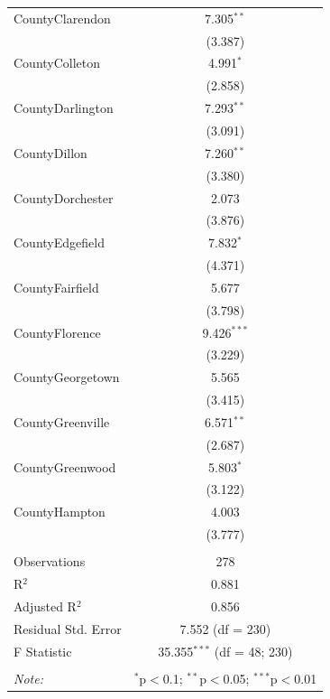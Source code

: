 \documentclass[11pt]{article}
\begin{document}
\begin{table}[H]
\begin{tabular}{@{\extracolsep{5pt}}lc}
     CountyClarendon & 7.305$^{**}$ \\
     & (3.387) \\
     CountyColleton & 4.991$^{*}$ \\
     & (2.858) \\
     CountyDarlington & 7.293$^{**}$ \\
     & (3.091) \\
     CountyDillon & 7.260$^{**}$ \\
     & (3.380) \\
     CountyDorchester & 2.073 \\
     & (3.876) \\
     CountyEdgefield & 7.832$^{*}$ \\
     & (4.371) \\
     CountyFairfield & 5.677 \\
     & (3.798) \\
     CountyFlorence & 9.426$^{***}$ \\
     & (3.229) \\
     CountyGeorgetown & 5.565 \\
     & (3.415) \\
     CountyGreenville & 6.571$^{**}$ \\
     & (2.687) \\
     CountyGreenwood & 5.803$^{*}$ \\
     & (3.122) \\
     CountyHampton & 4.003 \\
     & (3.777) \\

     \hline \\[-1.8ex]
     Observations & 278 \\
     R$^{2}$ & 0.881 \\
     Adjusted R$^{2}$ & 0.856 \\
     Residual Std. Error & 7.552 (df = 230) \\
     F Statistic & 35.355$^{***}$ (df = 48; 230) \\
    \hline
    \hline \\[-1.8ex]
    \textit{Note:}  & \multicolumn{1}{r}{$^{*}$p$<$0.1; $^{**}$p$<$0.05; $^{***}$p$<$0.01} \\
    \end{tabular}
  \end{table}
\end{document}
